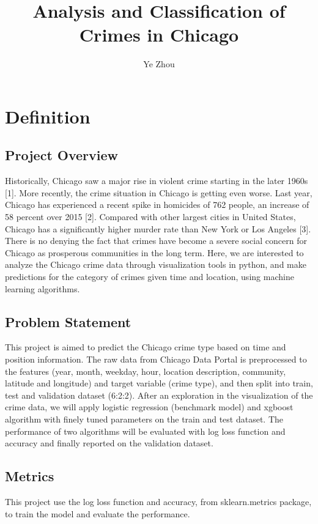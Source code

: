 \documentclass[12pt]{article}
\begin{document}
 
 
\title{Analysis and Classification of Crimes in Chicago}
\author{Ye Zhou}
\maketitle
 
\section{Definition}
\subsection{Project Overview}
Historically, Chicago saw a major rise in violent crime starting in the later 1960s [1]. More recently, the crime situation in Chicago is getting even worse. Last year, Chicago has experienced a recent spike in homicides of 762 people, an increase of 58 percent over 2015 [2]. Compared with other largest cities in United States, Chicago has a significantly higher murder rate than New York or Los Angeles [3]. There is no denying the fact that crimes have become a severe social concern for Chicago as prosperous communities in the long term. 
Here, we are interested to analyze the Chicago crime data through visualization tools in python, and make predictions for the category of crimes given time and location, using machine learning algorithms.
\subsection{Problem Statement}
This project is aimed to predict the Chicago crime type based on time and position information. The raw data from Chicago Data Portal is preprocessed to the features (year, month, weekday, hour, location description, community, latitude and longitude) and target variable (crime type), and then split into train, test and validation dataset (6:2:2). After an exploration in the visualization of the crime data, we will apply logistic regression (benchmark model) and xgboost algorithm with finely tuned parameters on the train and test dataset. The performance of two algorithms will be evaluated with log loss function and accuracy and finally reported on the validation dataset.

\subsection{Metrics} 
This project use the log loss function and accuracy, from sklearn.metrics package, to train the model and evaluate the performance.
\end{document}
